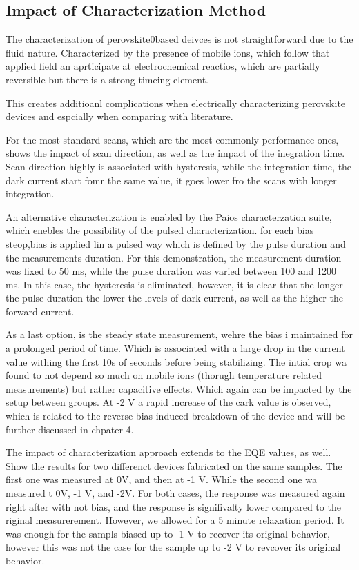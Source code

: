 \subsection{Impact of Characterization Method}

The characterization of perovskite0based deivces is not straightforward due to the fluid nature. Characterized by the presence of mobile ions, which follow that applied field an aprticipate at electrochemical reactios, which are partially reversible but there is a strong timeing element. 

This creates additioanl complications when electrically characterizing perovskite devices and espcially when comparing with literature. 

For the most standard scans, which are the most commonly performance ones, shows the impact of scan direction, as well as the impact of the inegration time. Scan direction highly is associated with hysteresis, while the integration time, the dark current start fomr the same value, it goes lower fro the scans with longer integration. 

An alternative characterization is enabled by the Paios characterzation suite, which enebles the possibility of the pulsed characterization. for each bias steop,bias is applied lin a pulsed way which is defined by the pulse duration and the measurements duration. For this demonstration, the measurement duration was fixed to 50 ms, while the pulse duration was varied between 100 and 1200 ms. In this case, the hysteresis is eliminated, however, it is clear that the longer the pulse duration the lower the levels of dark current, as well as the higher the forward current.

As a last option, is the steady state measurement, wehre the bias i maintained for a prolonged period of time. Which is associated with a large drop in the current value withing the first 10s of seconds before being stabilizing. The intial crop wa found to not depend so much on mobile ions (thorugh temperature related measurements) but rather capacitive effects. Which again can be impacted by the setup between groups. At -2 V a rapid increase of the cark value is observed, which is related to the reverse-bias induced breakdown of the device and will be further discussed in chpater 4. 

The impact of characterization approach extends to the EQE values, as well. Show the results for two differenct devices fabricated on the same samples. The first one was measured at 0V, and then at -1 V. While the second one wa measured t 0V, -1 V, and -2V. For both cases, the response was measured again right after with not bias, and the response is signifivalty lower compared to the riginal measurerement. However, we allowed for a 5 minute relaxation period. It was enough for the sampls biased up to -1 V to recover its original behavior, however this was not the case for the sample up to -2 V to revcover its original behavior. 

